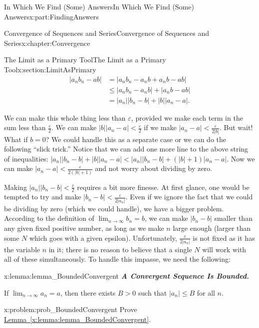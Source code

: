 \documentclass[oneside,10pt,]{book}
\newcommand{\xreffont}{\relax}
\newcommand{\alert}[1]{\textbf{\textit{#1}}}
\numberwithin{equation}{section}
\newcommand{\eps}{\varepsilon}
\newcommand{\lt}{<}
\newcommand{\amp}{&}
\begin{document}
\begin{partptx}{In Which We Find (Some) Answers}{}{In Which We Find (Some) Answers}{}{}{x:part:FindingAnswers}
\begin{chapterptx}{Convergence of Sequences and Series}{}{Convergence of Sequences and Series}{}{}{x:chapter:Convergence}
\begin{sectionptx}{The Limit as a Primary Tool}{}{The Limit as a Primary Tool}{}{}{x:section:LimitAsPrimary}
\begin{align*}
\left|a_n  b_n-a  b\right|\amp =\left|a_n  b_n-a_n b+a_n b-a  b\right|\\
\amp \leq\left|a_n  b_n-a_n  b\right|+\left|a_n b-a b\right|\\
\amp =\left|a_n\right|\left|b_n-b\right|+\left|b\right|\left|a_n-a\right|\text{.}
\end{align*}
%
\par
We can make this whole thing less than \(\eps\), provided we make each term in the sum less than \(\frac{\eps}{2}\). We can make \(\big|b\big|\big|a_n-a\big|\lt \frac{\eps}{2}\) if we make \(\big|a_n-a\big|\lt \frac{\eps}{2|b|}\). But wait! What if \(b=0\)? We could handle this as a separate case or we can do the following ``slick trick.'' Notice that we can add one more line to the above string of inequalities: \(\left|a_n\right|\left|b_n-b\right|+\left|b\right|\left|a_n-a\right|\lt \left|a_n \right|\left|b_n-b\right|+\left(\left|b\right|+1\right)\left|a_n-a \right|\). Now we can make \(\left|a_n-a\right|\lt \frac{\eps}{2\left(|b|+1\right)}\) and not worry about dividing by zero.%
\par
Making \(\big|a_n\big|\big|b_n-b\big|\lt \frac{\eps}{2}\) requires a bit more finesse. At first glance, one would be tempted to try and make \(\big|b_n-b\big|\lt \frac{\eps}{2|a_n|}\). Even if we ignore the fact that we could be dividing by zero (which we could handle), we have a bigger problem. According to the definition of \(\lim_{n\rightarrow\infty}b_n=b\), we can make \(\big|b_n-b\big|\) smaller than any given fixed positive number, as long as we make \(n\) large enough (larger than some \(N\) which goes with a given epsilon). Unfortunately, \(\frac{\eps}{2|a_n|}\) is not fixed as it has the variable \(n\) in it; there is no reason to believe that a single \(N\) will work with all of these simultaneously. To handle this impasse, we need the following:%
\begin{lemma}{}{}{x:lemma:lemma_BoundedConvergent}%
%
\alert{A Convergent Sequence Is Bounded.}%
\par
If \(\lim_{n\rightarrow\infty}a_n=a\), then there exists \(B>0\) such that \(|a_n|\leq B\) for all \(n\).%
\end{lemma}
\begin{problem}{}{x:problem:prob_BoundedConvergent}%
Prove \hyperref[x:lemma:lemma_BoundedConvergent]{Lemma~{\xreffont\ref{x:lemma:lemma_BoundedConvergent}}}.%
\par\smallskip%

\end{problem}
\end{sectionptx}
\end{chapterptx}
\end{partptx}
\end{document}
